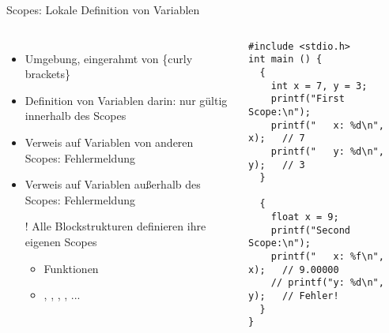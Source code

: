
\begin{frame}[fragile]{Scopes: Lokale Definition von Variablen}
%
\vspace{-15pt}
\begin{columns}[t]
\begin{itemize}
\item Umgebung, eingerahmt von \{curly brackets\}
\item Definition von Variablen darin: nur gültig innerhalb des Scopes
\item Verweis auf Variablen von anderen Scopes: Fehlermeldung
\item Verweis auf Variablen außerhalb des Scopes: Fehlermeldung
\item[!] Alle Blockstrukturen definieren ihre eigenen Scopes
	\begin{itemize}
	\item Funktionen
	\item {}, , , , ...
	\end{itemize}
\end{itemize}
%
\begin{codebox}
\begin{verbatim}
#include <stdio.h>
int main () {
  {
    int x = 7, y = 3;
    printf("First Scope:\n");
    printf("   x: %d\n", x);   // 7
    printf("   y: %d\n", y);   // 3
  }

  {
    float x = 9;
    printf("Second Scope:\n");
    printf("   x: %f\n", x);   // 9.00000
    // printf("y: %d\n", y);   // Fehler!
  }
}
\end{verbatim}
\end{codebox}
\end{columns}
%
\end{frame}


